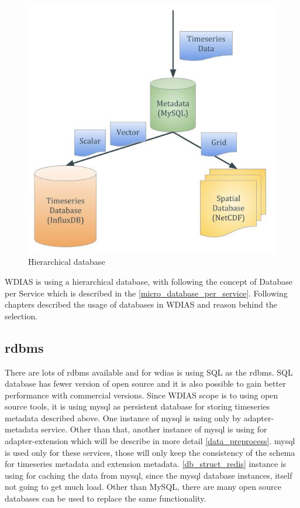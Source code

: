 \begin{figure}[htp]
    \centering
    \includegraphics[width=1\textwidth]{method/microservice/hierarchical_database.jpg}
    \caption{Hierarchical database}
    \label{fi:hierarchical_database}
\end{figure}

WDIAS is using a hierarchical database, with following the concept of Database per Service which is described in the \ref{micro_database_per_service}.
Following chapters described the usage of databases in WDIAS and reason behind the selection.

\subsection{\acrshort{rdbms}}
\label{sub:mysql}

There are lots of \acrshort{rdbms} available and for \acrshort{wdias} is using SQL as the \acrfull{rdbms}.
SQL database has fewer version of open source and it is also possible to gain better performance with commercial versions. 
Since WDIAS scope is to using open source tools, it is using \acrshort{mysql} as persistent database for storing timeseries metadata described above.
One instance of \acrshort{mysql} is using only by adapter-metadata service.
Other than that, another instance of \acrshort{mysql} is using for adapter-extension which will be describe in more detail \ref{data_preprocess}.
\acrshort{mysql} is used only for these services, those will only keep the consistency of the schema for timeseries metadata and extension metadata.
\ref{db_struct_redis} instance is using for caching the data from \acrshort{mysql}, since the \acrshort{mysql} database instances, itself not going to get much load.
Other than MySQL, there are many open source databases can be used to replace the same functionality.


